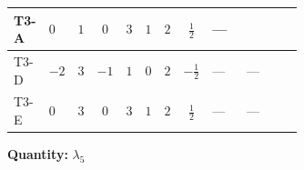 \documentclass[8pt]{article}
\begin{document}
\begin{landscape}
\begin{longtable}{@{}llcccccc >{\raggedright\arraybackslash}p{0.21\linewidth} >{\raggedright\arraybackslash}p{0.21\linewidth} >{\raggedright\arraybackslash}p{0.21\linewidth}@{}}
\midrule
T3-A & $0$ & $1$ & $0$ & $3$ & $1$ & $2$ & $\frac{1}{2}$ & --- & \scriptsize\adjustbox{max width=\linewidth}{$\begin{gathered} {\lambda_5} (2 T_{\nu}^{(1)}+T_{\nu}^{(2)}+6 \operatorname{Tr}\!\left({Y_d}\,\left({Y_d}\right)^{\dagger}\right)+2 \operatorname{Tr}\!\left({Y_e}\,\left({Y_e}\right)^{\dagger}\right)+6 \operatorname{Tr}\!\left({Y_u}\,\left({Y_u}\right)^{\dagger}\right)+4 {\lambda_{HS_2}^{(A)}})\end{gathered}$} & \scriptsize\adjustbox{max width=\linewidth}{$\begin{gathered} -\frac{21 {g_2}^2 {\lambda_5}}{2}\end{gathered}$} \\
\midrule
T3-D & $-2$ & $3$ & $-1$ & $1$ & $0$ & $2$ & $-\frac{1}{2}$ & --- & --- & \scriptsize\adjustbox{max width=\linewidth}{$\begin{gathered} -\frac{21 {g_2}^2 {\lambda_5}}{2}\end{gathered}$} \\
\midrule
T3-E & $0$ & $3$ & $0$ & $3$ & $1$ & $2$ & $\frac{1}{2}$ & --- & --- & \scriptsize\adjustbox{max width=\linewidth}{$\begin{gathered} -\frac{33 {g_2}^2 {\lambda_5}}{2}\end{gathered}$} \\
\midrule
\bottomrule
\end{longtable}
\clearpage
\noindent\textbf{Quantity: }$\lambda_5$\par\smallskip

\end{landscape}
\end{document}
